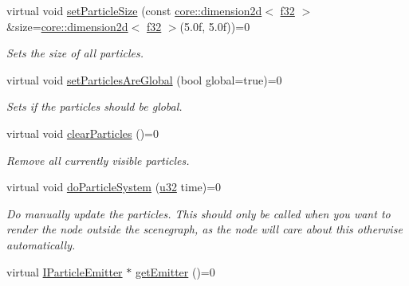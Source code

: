 \begin{DoxyCompactItemize}
virtual void \hyperlink{classirr_1_1scene_1_1IParticleSystemSceneNode_a17e1abe0feb0b57e96bf49d984bcbb86}{set\+Particle\+Size} (const \hyperlink{classirr_1_1core_1_1dimension2d}{core\+::dimension2d}$<$ \hyperlink{namespaceirr_a0277be98d67dc26ff93b1a6a1d086b07}{f32} $>$ \&size=\hyperlink{classirr_1_1core_1_1dimension2d}{core\+::dimension2d}$<$ \hyperlink{namespaceirr_a0277be98d67dc26ff93b1a6a1d086b07}{f32} $>$(5.\+0f, 5.\+0f))=0
\begin{DoxyCompactList}\small\item\em Sets the size of all particles. \end{DoxyCompactList}\item 
virtual void \hyperlink{classirr_1_1scene_1_1IParticleSystemSceneNode_adc1c12bd7bf1a075f00c5dafa3aff266}{set\+Particles\+Are\+Global} (bool global=true)=0
\begin{DoxyCompactList}\small\item\em Sets if the particles should be global. \end{DoxyCompactList}\item 
\mbox{\label{classirr_1_1scene_1_1IParticleSystemSceneNode_aaebda202df3c76911773ebf80ed9e393}} 
virtual void \hyperlink{classirr_1_1scene_1_1IParticleSystemSceneNode_aaebda202df3c76911773ebf80ed9e393}{clear\+Particles} ()=0
\begin{DoxyCompactList}\small\item\em Remove all currently visible particles. \end{DoxyCompactList}\item 
\mbox{\label{classirr_1_1scene_1_1IParticleSystemSceneNode_aac6245c300b7226cb2b911b0ea642cec}} 
virtual void \hyperlink{classirr_1_1scene_1_1IParticleSystemSceneNode_aac6245c300b7226cb2b911b0ea642cec}{do\+Particle\+System} (\hyperlink{namespaceirr_a0416a53257075833e7002efd0a18e804}{u32} time)=0
\begin{DoxyCompactList}\small\item\em Do manually update the particles. This should only be called when you want to render the node outside the scenegraph, as the node will care about this otherwise automatically. \end{DoxyCompactList}\item 
virtual \hyperlink{classirr_1_1scene_1_1IParticleEmitter}{I\+Particle\+Emitter} $\ast$ \hyperlink{classirr_1_1scene_1_1IParticleSystemSceneNode_a2f1a12f030ad5aadfd8d1be24021c7d5}{get\+Emitter} ()=0

\end{DoxyCompactItemize}
